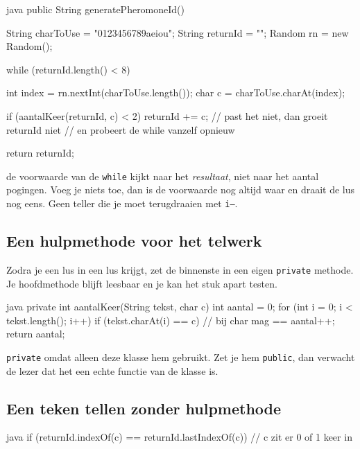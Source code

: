 \documentclass[a4paper,11pt]{article}
\begin{document}
\begin{codeblock}{java}
    public String generatePheromoneId()
    {
            String charToUse = "0123456789aeiou";
            String returnId = "";
            Random rn = new Random();

            while (returnId.length() < 8)
            {
                    int index = rn.nextInt(charToUse.length());
                    char c = charToUse.charAt(index);

                    if (aantalKeer(returnId, c) < 2)
                    {
                            returnId += c;
                        }
                    // past het niet, dan groeit returnId niet
                    // en probeert de while vanzelf opnieuw
                }
            return returnId;
        }
\end{codeblock}

 de voorwaarde van de \texttt{while} kijkt naar het
\emph{resultaat}, niet naar het aantal pogingen. Voeg je niets toe, dan is de
voorwaarde nog altijd waar en draait de lus nog eens. Geen teller die je moet
terugdraaien met \texttt{i--}.

\subsection{Een hulpmethode voor het telwerk}

Zodra je een lus in een lus krijgt, zet de binnenste in een eigen
\texttt{private} methode. Je hoofdmethode blijft leesbaar en je kan het stuk
apart testen.

\begin{codeblock}{java}
    private int aantalKeer(String tekst, char c)
    {
    int aantal = 0;
    for (int i = 0; i < tekst.length(); i++)
    {
    if (tekst.charAt(i) == c)   // bij char mag ==
    {
    aantal++;
    }
    }
    return aantal;
    }
\end{codeblock}

\texttt{private} omdat alleen deze klasse hem gebruikt. Zet je hem
\texttt{public}, dan verwacht de lezer dat het een echte functie van de klasse is.

\subsection{Een teken tellen zonder hulpmethode}

\begin{codeblock}{java}
    if (returnId.indexOf(c) == returnId.lastIndexOf(c))
    {
            // c zit er 0 of 1 keer in
        }
\end{codeblock}
\end{document}
